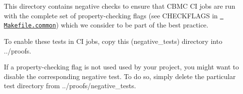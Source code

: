 This directory contains negative checks to ensure that CBMC CI jobs are run with the complete set of property-\/checking flags (see {\ttfamily CHECKFLAGS} in \href{../proofs/Makefile.common}{\texttt{ Makefile.\+common}}) which we consider to be part of the best practice.

To enable these tests in CI jobs, copy this ({\ttfamily negative\+\_\+tests}) directory into {\ttfamily ../proofs}.

If a property-\/checking flag is not used used by your project, you might want to disable the corresponding negative test. To do so, simply delete the particular test directory from {\ttfamily ../proofs/negative\+\_\+tests}. 